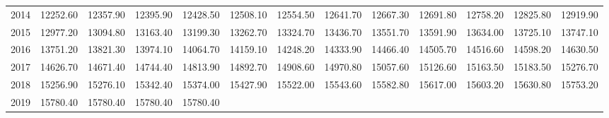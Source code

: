 \begin{longtable}{rrrrrrrrrrrrr}
  2014 & 12252.60 & 12357.90 & 12395.90 & 12428.50 & 12508.10 & 12554.50 & 12641.70 & 12667.30 & 12691.80 & 12758.20 & 12825.80 & 12919.90 \\ 
  2015 & 12977.20 & 13094.80 & 13163.40 & 13199.30 & 13262.70 & 13324.70 & 13436.70 & 13551.70 & 13591.90 & 13634.00 & 13725.10 & 13747.10 \\ 
  2016 & 13751.20 & 13821.30 & 13974.10 & 14064.70 & 14159.10 & 14248.20 & 14333.90 & 14466.40 & 14505.70 & 14516.60 & 14598.20 & 14630.50 \\ 
  2017 & 14626.70 & 14671.40 & 14744.40 & 14813.90 & 14892.70 & 14908.60 & 14970.80 & 15057.60 & 15126.60 & 15163.50 & 15183.50 & 15276.70 \\ 
  2018 & 15256.90 & 15276.10 & 15342.40 & 15374.00 & 15427.90 & 15522.00 & 15543.60 & 15582.80 & 15617.00 & 15603.20 & 15630.80 & 15753.20 \\ 
  2019 & 15780.40 & 15780.40 & 15780.40 & 15780.40 &  &  &  &  &  &  &  &  \\ 
   \hline
\hline
\end{longtable}

